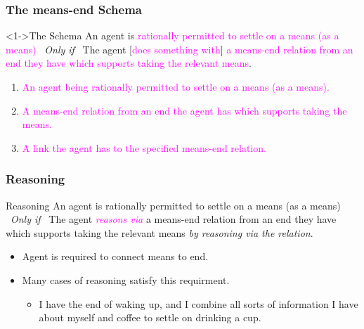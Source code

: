 \documentclass[noamssymb, compress, handout]{beamer} %
\begin{document}
\begin{frame}
  \frametitle{The means-end Schema}

  \begin{block}<1->{The Schema}
    An agent is \textcolor<3>{fuchsia}{rationally permitted to settle on a means (as a means)}
    \newline
    \mbox{ }\hfill\emph{Only if}\hfill\mbox{ }
    \newline
    The agent [\textcolor<5>{fuchsia}{does something with}] \textcolor<4>{fuchsia}{a means-end relation from an end they have which supports taking the relevant means}.
  \end{block}

  \begin{enumerate}%
  \item<3-5> \textcolor<3>{fuchsia}{An agent being rationally permitted to settle on a means (as a means).}
  \item<4-5> \textcolor<4>{fuchsia}{A means-end relation from an end the agent has which supports taking the means.}
  \item<5-5> \textcolor<5>{fuchsia}{A link the agent has to the specified means-end relation.}
  \end{enumerate}
\end{frame}

\begin{frame}
  \frametitle{Reasoning}

  \begin{block}{Reasoning}
    An agent is rationally permitted to settle on a means (as a means)
    \newline
    \mbox{ }\hfill\emph{Only if}\hfill\mbox{ }
    \newline
    The agent \textcolor{fuchsia}{\emph{reasons via}} a means-end relation from an end they have which supports taking the relevant means \emph{by reasoning via the relation}.
  \end{block}

  \begin{itemize}
  \item Agent is required to connect means to end.
  \item Many cases of reasoning satisfy this requirment.
    \begin{itemize}
    \item I have the end of waking up, and I combine all sorts of information I have about myself and coffee to settle on drinking a cup.
    \end{itemize}
  \end{itemize}
\end{frame}
\end{document}

